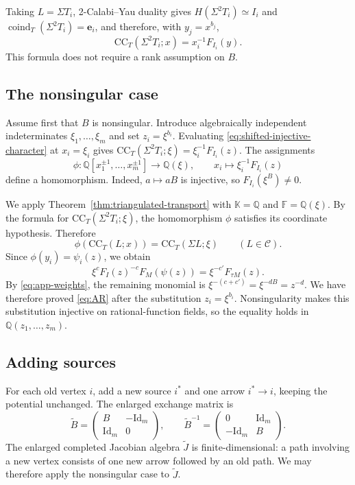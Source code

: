 \documentclass[11pt]{amsart}
\numberwithin{equation}{section}
\theoremstyle{definition}
\theoremstyle{remark}
\newcommand{\op}[1]{\operatorname{#1}}
\newcommand{\C}{\mathcal C}
\newcommand{\CC}{\mathrm{CC}}
\newcommand{\QQ}{\mathbb Q}
\newcommand{\coind}{\op{coind}}
\begin{document}
Taking $L=\Sigma T_i$, 2-Calabi--Yau duality gives
$H(\Sigma^2T_i)\simeq I_i$ and $\coind_T(\Sigma^2T_i)=\mathbf e_i$,
and therefore, with $y_j=x^{b_j}$,
\begin{equation}\label{eq:shifted-injective-character}
\CC_T(\Sigma^2T_i;x)=x_i^{-1}F_{I_i}(y).
\end{equation}
This formula does not require a rank assumption on $B$.

\subsection{The nonsingular case}
Assume first that $B$ is nonsingular. Introduce algebraically independent indeterminates
$\xi_1,\ldots,\xi_m$ and set $z_i=\xi^{b_i}$. Evaluating
\eqref{eq:shifted-injective-character} at $x_i=\xi_i$ gives
$\CC_T(\Sigma^2T_i;\xi)=\xi_i^{-1}F_{I_i}(z)$.
The assignments
\[ \phi:\QQ[x_1^{\pm1},\ldots,x_m^{\pm1}]\longrightarrow\QQ(\xi), \qquad x_i\longmapsto \xi_i^{-1}F_{I_i}(z) \]
define a homomorphism. Indeed, $a\mapsto aB$ is injective, so
$F_{I_i}(\xi^B)\ne0$.

We apply Theorem~\ref{thm:triangulated-transport} with
$\mathbb K=\QQ$ and $\mathbb F=\QQ(\xi)$. By the formula for
$\CC_T(\Sigma^2T_i;\xi)$, the homomorphism $\phi$ satisfies its
coordinate hypothesis. Therefore
\[ \phi(\CC_T(L;x))=\CC_T(\Sigma L;\xi) \qquad(L\in\C). \]
Since $\phi(y_i)=\psi_i(z)$, we obtain
\[ \xi^cF_I(z)^{-c}F_M(\psi(z))=\xi^{-c'}F_{\tau M}(z). \]
By \eqref{eq:app-weights}, the remaining monomial is
$\xi^{-(c+c')}=\xi^{-dB}=z^{-d}$. We have therefore proved
\eqref{eq:AR} after the substitution $z_i=\xi^{b_i}$.
Nonsingularity makes this substitution injective on rational-function
fields, so the equality holds in $\QQ(z_1,\ldots,z_m)$.

\subsection{Adding sources}
For each old vertex $i$, add a new source $i^*$ and one arrow
$i^*\to i$, keeping the potential unchanged. The enlarged exchange
matrix is
\[ \widetilde B= \begin{pmatrix}B&-\mathrm{Id}_m\\ \mathrm{Id}_m&0\end{pmatrix},\qquad \widetilde B^{-1}= \begin{pmatrix}0&\mathrm{Id}_m\\-\mathrm{Id}_m&B\end{pmatrix}. \]
The enlarged completed Jacobian algebra $\widetilde J$ is
finite-dimensional: a path involving a new vertex consists of one
new arrow followed by an old path. We may therefore apply the
nonsingular case to $\widetilde J$.
\end{document}
